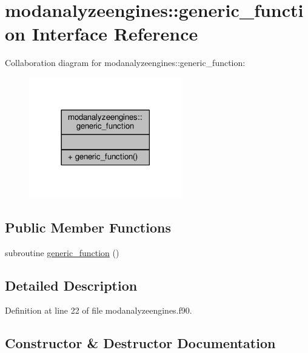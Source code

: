 \hypertarget{interfacemodanalyzeengines_1_1generic__function}{}\section{modanalyzeengines\+:\+:generic\+\_\+function Interface Reference}
\label{interfacemodanalyzeengines_1_1generic__function}


Collaboration diagram for modanalyzeengines\+:\+:generic\+\_\+function\+:\nopagebreak
\begin{figure}[H]
\begin{center}
\leavevmode
\includegraphics[width=189pt]{interfacemodanalyzeengines_1_1generic__function__coll__graph}
\end{center}
\end{figure}
\subsection*{Public Member Functions}
\begin{DoxyCompactItemize}
\item 
subroutine \hyperlink{interfacemodanalyzeengines_1_1generic__function_a031225827ffca8c645f394c976ad82ef}{generic\+\_\+function} ()
\end{DoxyCompactItemize}


\subsection{Detailed Description}


Definition at line 22 of file modanalyzeengines.\+f90.



\subsection{Constructor \& Destructor Documentation}
